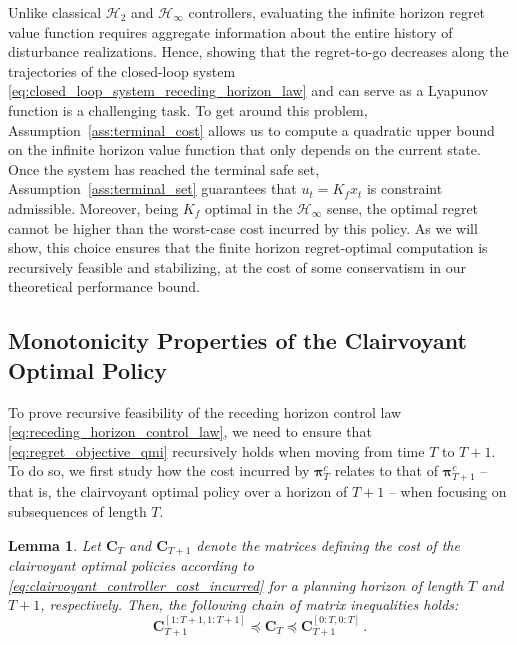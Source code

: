 \documentclass[conference]{IEEEtran}
\newtheorem{lemma}{Lemma}
\begin{document}
Unlike classical $\mathcal{H}_2$ and $\mathcal{H}_\infty$ controllers, evaluating the infinite horizon regret value function requires aggregate information about the entire history of disturbance realizations. Hence, showing that the regret-to-go decreases along the trajectories of the closed-loop system \eqref{eq:closed_loop_system_receding_horizon_law} and can serve as a Lyapunov function is a challenging task. To get around this problem, Assumption~\ref{ass:terminal_cost} allows us to compute a quadratic upper bound on the infinite horizon value function that only depends on the current state. %
Once the system has reached the terminal safe set, Assumption~\ref{ass:terminal_set} guarantees that $u_t = K_f x_t$ is constraint admissible. Moreover, being $K_f$ optimal in the $\mathcal{H}_\infty$ sense, the optimal regret cannot be higher than the worst-case cost incurred by this policy. As we will show, this choice ensures that the finite horizon regret-optimal computation is recursively feasible and stabilizing, at the cost of some conservatism in our theoretical performance bound.%
 \subsection{Monotonicity Properties of the Clairvoyant Optimal Policy}
To prove recursive feasibility of the receding horizon control law \eqref{eq:receding_horizon_control_law}, we need to ensure that \eqref{eq:regret_objective_qmi} recursively holds when moving from time $T$ to $T+1$. To do so, we first study how the cost incurred by $\bm{\pi}_T^c$ relates to that of $\bm{\pi}_{T+1}^c$ – that is, the clairvoyant optimal policy over a horizon of $T+1$ – when focusing on subsequences of length $T$. %
\begin{lemma}
    \label{le:relations_clairvoyant}
    Let $\mathbf{C}_T$ and $\mathbf{C}_{T+1}$ denote the matrices defining the cost of the clairvoyant optimal policies according to \eqref{eq:clairvoyant_controller_cost_incurred} for a planning horizon of length $T$ and $T + 1$, respectively.
    Then, the following chain of matrix inequalities holds:
    \begin{equation}
        \label{eq:clairvoyant_inequalities_chain}
        \mathbf{C}_{T+1}^{[1:T+1, 1:T+1]} \preceq \mathbf{C}_{T} \preceq \mathbf{C}_{T+1}^{[0:T, 0:T]}\,.
    \end{equation}
\end{lemma}
\end{document}
